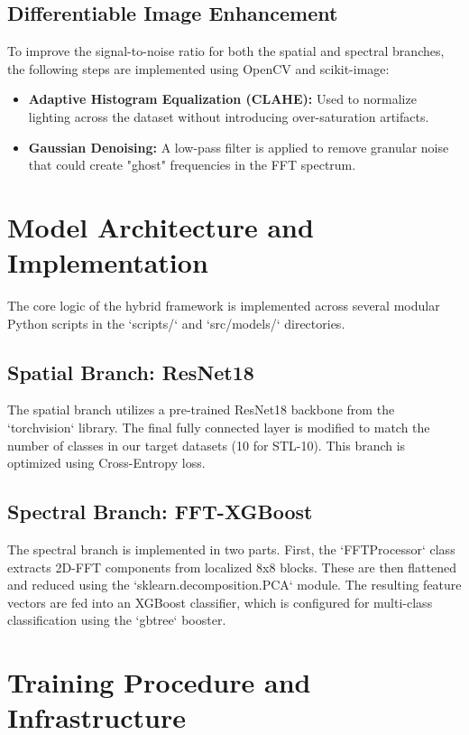 \subsection{Differentiable Image Enhancement}
To improve the signal-to-noise ratio for both the spatial and spectral branches, the following steps are implemented using OpenCV and scikit-image:
\begin{itemize}
    \item \textbf{Adaptive Histogram Equalization (CLAHE):} Used to normalize lighting across the dataset without introducing over-saturation artifacts.
    \item \textbf{Gaussian Denoising:} A low-pass filter is applied to remove granular noise that could create "ghost" frequencies in the FFT spectrum.
\end{itemize}

\section{Model Architecture and Implementation}

The core logic of the hybrid framework is implemented across several modular Python scripts in the `scripts/` and `src/models/` directories.

\subsection{Spatial Branch: ResNet18}
The spatial branch utilizes a pre-trained ResNet18 backbone from the `torchvision` library. The final fully connected layer is modified to match the number of classes in our target datasets (10 for STL-10). This branch is optimized using Cross-Entropy loss.

\subsection{Spectral Branch: FFT-XGBoost}
The spectral branch is implemented in two parts. First, the `FFTProcessor` class extracts 2D-FFT components from localized 8x8 blocks. These are then flattened and reduced using the `sklearn.decomposition.PCA` module. The resulting feature vectors are fed into an XGBoost classifier, which is configured for multi-class classification using the `gbtree` booster.

\section{Training Procedure and Infrastructure}

